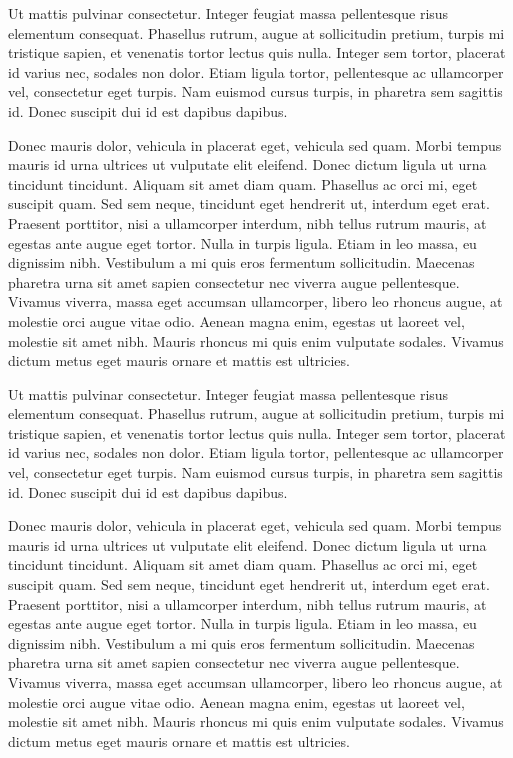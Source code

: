 \documentclass{FramateX}
\begin{document}
Ut mattis pulvinar consectetur. Integer feugiat massa pellentesque risus elementum consequat. Phasellus rutrum, augue at sollicitudin pretium, turpis mi tristique sapien, et venenatis tortor lectus quis nulla. Integer sem tortor, placerat id varius nec, sodales non dolor. Etiam ligula tortor, pellentesque ac ullamcorper vel, consectetur eget turpis. Nam euismod cursus turpis, in pharetra sem sagittis id. Donec suscipit dui id est dapibus dapibus.

Donec mauris dolor, vehicula in placerat eget, vehicula sed quam. Morbi tempus mauris id urna ultrices ut vulputate elit eleifend. Donec dictum ligula ut urna tincidunt tincidunt. Aliquam sit amet diam quam. Phasellus ac orci mi, eget suscipit quam. Sed sem neque, tincidunt eget hendrerit ut, interdum eget erat. Praesent porttitor, nisi a ullamcorper interdum, nibh tellus rutrum mauris, at egestas ante augue eget tortor. Nulla in turpis ligula. Etiam in leo massa, eu dignissim nibh. Vestibulum a mi quis eros fermentum sollicitudin. Maecenas pharetra urna sit amet sapien consectetur nec viverra augue pellentesque. Vivamus viverra, massa eget accumsan ullamcorper, libero leo rhoncus augue, at molestie orci augue vitae odio. Aenean magna enim, egestas ut laoreet vel, molestie sit amet nibh. Mauris rhoncus mi quis enim vulputate sodales. Vivamus dictum metus eget mauris ornare et mattis est ultricies.

Ut mattis pulvinar consectetur. Integer feugiat massa pellentesque risus elementum consequat. Phasellus rutrum, augue at sollicitudin pretium, turpis mi tristique sapien, et venenatis tortor lectus quis nulla. Integer sem tortor, placerat id varius nec, sodales non dolor. Etiam ligula tortor, pellentesque ac ullamcorper vel, consectetur eget turpis. Nam euismod cursus turpis, in pharetra sem sagittis id. Donec suscipit dui id est dapibus dapibus.

Donec mauris dolor, vehicula in placerat eget, vehicula sed quam. Morbi tempus mauris id urna ultrices ut vulputate elit eleifend. Donec dictum ligula ut urna tincidunt tincidunt. Aliquam sit amet diam quam. Phasellus ac orci mi, eget suscipit quam. Sed sem neque, tincidunt eget hendrerit ut, interdum eget erat. Praesent porttitor, nisi a ullamcorper interdum, nibh tellus rutrum mauris, at egestas ante augue eget tortor. Nulla in turpis ligula. Etiam in leo massa, eu dignissim nibh. Vestibulum a mi quis eros fermentum sollicitudin. Maecenas pharetra urna sit amet sapien consectetur nec viverra augue pellentesque. Vivamus viverra, massa eget accumsan ullamcorper, libero leo rhoncus augue, at molestie orci augue vitae odio. Aenean magna enim, egestas ut laoreet vel, molestie sit amet nibh. Mauris rhoncus mi quis enim vulputate sodales. Vivamus dictum metus eget mauris ornare et mattis est ultricies.
\end{document}
